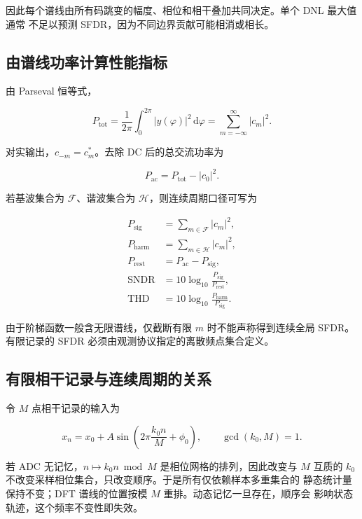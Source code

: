 \documentclass[11pt,a4paper]{ctexart}
\newcommand{\dd}{\,\mathrm{d}}
\theoremstyle{adcplain}
\theoremstyle{definition}
\begin{document}
因此每个谱线由所有码跳变的幅度、相位和相干叠加共同决定。单个 DNL 最大值通常
不足以预测 SFDR，因为不同边界贡献可能相消或相长。

\subsection{由谱线功率计算性能指标}

由 Parseval 恒等式，

\begin{equation}
  P_{\mathrm{tot}}
  =
  \frac{1}{2\pi}\int_0^{2\pi}|y(\varphi)|^2\dd\varphi
  =
  \sum_{m=-\infty}^{\infty}|c_m|^2.
  \label{eq:parseval}
\end{equation}

对实输出，$c_{-m}=c_m^\ast$。去除 DC 后的总交流功率为

\begin{equation}
  P_{\mathrm{ac}}=P_{\mathrm{tot}}-|c_0|^2.
\end{equation}

若基波集合为 $\mathcal F$、谐波集合为 $\mathcal H$，则连续周期口径可写为

\begin{align}
  P_{\mathrm{sig}} &= \sum_{m\in\mathcal F}|c_m|^2,\\
  P_{\mathrm{harm}} &= \sum_{m\in\mathcal H}|c_m|^2,\\
  P_{\mathrm{rest}} &= P_{\mathrm{ac}}-P_{\mathrm{sig}},\\
  \mathrm{SNDR} &= 10\log_{10}\frac{P_{\mathrm{sig}}}{P_{\mathrm{rest}}},\\
  \mathrm{THD} &= 10\log_{10}\frac{P_{\mathrm{harm}}}{P_{\mathrm{sig}}}.
  \label{eq:continuous-metrics}
\end{align}

由于阶梯函数一般含无限谱线，仅截断有限 $m$ 时不能声称得到连续全局 SFDR。
有限记录的 SFDR 必须由观测协议指定的离散频点集合定义。

\subsection{有限相干记录与连续周期的关系}

令 $M$ 点相干记录的输入为

\begin{equation}
  x_n=x_0+A\sin\left(2\pi\frac{k_0 n}{M}+\phi_0\right),
  \qquad \gcd(k_0,M)=1.
\end{equation}

若 ADC 无记忆，$n\mapsto k_0n\bmod M$ 是相位网格的排列，因此改变与 $M$
互质的 $k_0$ 不改变采样相位集合，只改变顺序。于是所有仅依赖样本多重集合的
静态统计量保持不变；DFT 谱线的位置按模 $M$ 重排。动态记忆一旦存在，顺序会
影响状态轨迹，这个频率不变性即失效。
\end{document}

